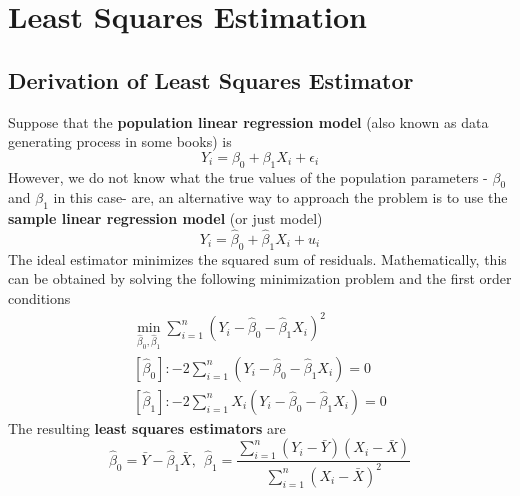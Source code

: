 \documentclass[12pt]{article}
\theoremstyle{definition}
\theoremstyle{property}
\theoremstyle{assumption}
\theoremstyle{example}
\theoremstyle{comment}
\begin{document}
\section{Least Squares Estimation}
\subsection{Derivation of Least Squares Estimator}
Suppose that the \textbf{population linear regression model} (also known as data generating process in some books) is
\[
Y_i = \beta_0 + \beta_1X_i + \epsilon_i
\]
However, we do not know what the true values of the population parameters - $\beta_0$ and $\beta_1$ in this case- are, an alternative way to approach the problem is to use the \textbf{sample linear regression model} (or just model)
\[
Y_i = \hat{\beta}_0 +\hat{\beta}_1X_i +u_i
\]
The ideal estimator minimizes the squared sum of residuals. Mathematically, this can be obtained by solving the following minimization problem and the first order conditions
\footnotesize{\begin{gather*}
\min_{\hat{\beta}_0, \hat{\beta}_1} \sum_{i=1}^n (Y_i-\hat{\beta}_0 - \hat{\beta}_1X_i)^2\\
[\hat{\beta}_0]: -2\sum_{i=1}^n(Y_i-\hat{\beta}_0-\hat{\beta}_1X_i)=0\\
[\hat{\beta}_1]: -2\sum_{i=1}^nX_i(Y_i-\hat{\beta}_0-\hat{\beta}_1X_i)=0 
\end{gather*}}\normalsize
The resulting \textbf{least squares estimators} are
\[
\hat{\beta}_0 = \bar{Y}-\hat{\beta}_1\bar{X}, \ \ \hat{\beta}_1=\frac{\sum_{i=1}^n(Y_i-\bar{Y})(X_i-\bar{X})}{\sum_{i=1}^n(X_i-\bar{X})^2}
\]
\end{document}
